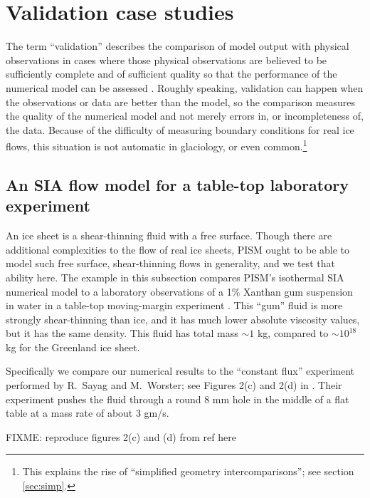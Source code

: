 
\section{Validation case studies}\label{sec:validation} 

The term ``validation'' describes the comparison of model output with physical observations in cases where those physical observations are believed to be sufficiently complete and of sufficient quality so that the performance of the numerical model can be assessed \cite{Roache,Wesseling}.  Roughly speaking, validation can happen when the observations or data are better than the model, so the comparison measures the quality of the numerical model and not merely errors in, or incompleteness of, the data.  Because of the difficulty of measuring boundary conditions for real ice flows, this situation is not automatic in glaciology, or even common.\footnote{This explains the rise of ``simplified geometry intercomparisons''; see section \ref{sec:simp}.}

\subsection{An SIA flow model for a table-top laboratory experiment}\label{sec:labgum}
 

An ice sheet is a shear-thinning fluid with a free surface.  Though there are additional complexities to the flow of real ice sheets, PISM ought to be able to model such free surface, shear-thinning flows in generality, and we test that ability here.  The example in this subsection compares PISM's isothermal SIA numerical model to a laboratory observations of a 1\% Xanthan gum suspension in water in a table-top moving-margin experiment \cite{SayagWorster2013,SayagPeglerWorster2012}.  This ``gum'' fluid is more strongly shear-thinning than ice, and it has much lower absolute viscosity values, but it has the same density.  This fluid has total mass $\sim 1$ kg, compared to $\sim 10^{18}$ kg for the Greenland ice sheet.

Specifically we compare our numerical results to the ``constant flux'' experiment performed by R.~Sayag and M.~Worster; see Figures 2(c) and 2(d) in \cite{SayagWorster2013}.  Their experiment pushes the fluid through a round 8 mm hole in the middle of a flat table at a mass rate of about 3 gm/s.

FIXME: reproduce figures 2(c) and (d) from ref here

